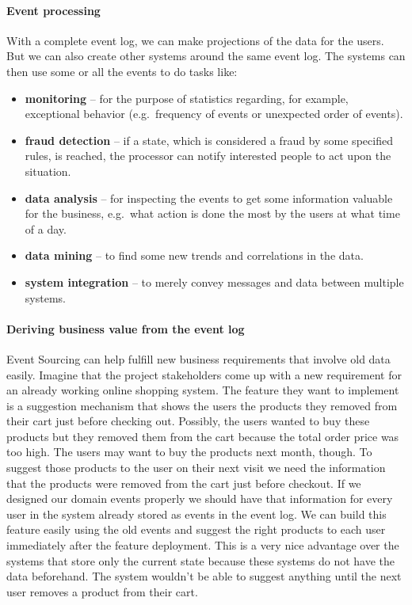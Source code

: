 \documentclass{book}
\begin{document}
\paragraph{Event processing}\label{event-processing}

With a complete event log, we can make projections of the data for the
users. But we can also create other systems around the same event log.
The systems can then use some or all the events to do tasks like:

\begin{itemize}
\tightlist
\item
  \textbf{monitoring} -- for the purpose of statistics regarding, for
  example, exceptional behavior (e.g.~frequency of events or unexpected
  order of events).
\item
  \textbf{fraud detection} -- if a state, which is considered a fraud by
  some specified rules, is reached, the processor can notify interested
  people to act upon the situation.
\item
  \textbf{data analysis} -- for inspecting the events to get some
  information valuable for the business, e.g.~what action is done the
  most by the users at what time of a day.
\item
  \textbf{data mining} -- to find some new trends and correlations in
  the data.
\item
  \textbf{system integration} -- to merely convey messages and data
  between multiple systems.
\end{itemize}

\paragraph{Deriving business value from the event
log}\label{deriving-business-value-from-the-event-log}

Event Sourcing can help fulfill new business requirements that involve
old data easily. Imagine that the project stakeholders come up with a
new requirement for an already working online shopping system. The
feature they want to implement is a suggestion mechanism that shows the
users the products they removed from their cart just before checking
out. Possibly, the users wanted to buy these products but they removed
them from the cart because the total order price was too high. The users
may want to buy the products next month, though. To suggest those
products to the user on their next visit we need the information that
the products were removed from the cart just before checkout. If we
designed our domain events properly we should have that information for
every user in the system already stored as events in the event log. We
can build this feature easily using the old events and suggest the right
products to each user immediately after the feature deployment. This is
a very nice advantage over the systems that store only the current state
because these systems do not have the data beforehand. The system
wouldn't be able to suggest anything until the next user removes a
product from their cart.
\end{document}
